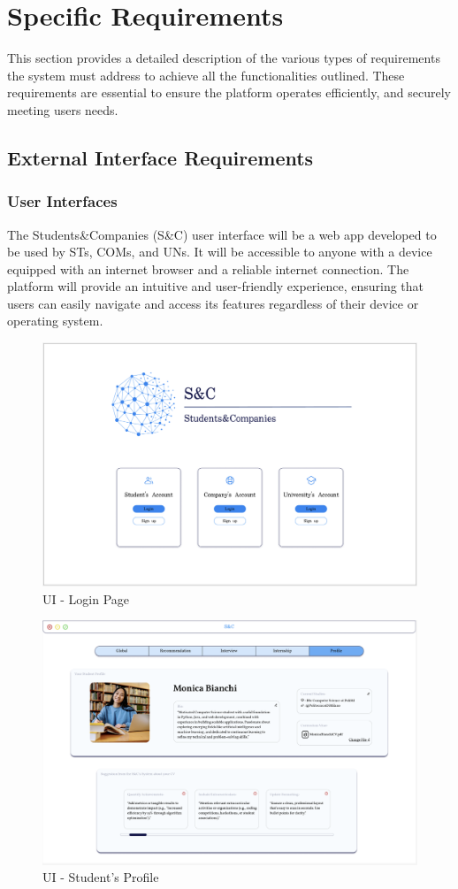 
\chapter{Specific Requirements}
This section provides a detailed description of the various types of requirements the system must address to achieve all the functionalities outlined. These requirements are essential to ensure the platform operates efficiently, and securely meeting users needs. 

\section{External Interface Requirements}
\subsection{User Interfaces}
The Students\&Companies (S\&C) user interface will be a web app developed to be used by STs, COMs, and UNs. It will be accessible to anyone with a device equipped with an internet browser and a reliable internet connection. The platform will provide an intuitive and user-friendly experience, ensuring that users can easily navigate and access its features regardless of their device or operating system.

\begin{figure}[H]
    \centering
    \includegraphics[width=0.8\linewidth]{RASD//Images/UI - Login Page.png}
    \caption{UI - Login Page}
\end{figure}

\begin{figure}[H]
    \centering
    \includegraphics[width=0.8\linewidth]{RASD//Images/UI - Student's Profile.png}
    \caption{UI - Student's Profile}
\end{figure}

